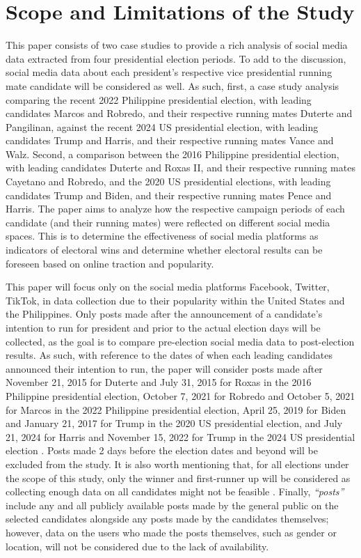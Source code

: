 \section{Scope and Limitations of the Study}
This paper consists of two case studies to provide a rich analysis of social media data extracted from four presidential election periods. To add to the discussion, social media data about each president’s respective vice presidential running mate candidate will be considered as well. As such, first, a case study analysis comparing the recent 2022 Philippine presidential election, with leading candidates Marcos and Robredo, and their respective running mates Duterte and Pangilinan, against the recent 2024 US presidential election, with leading candidates Trump and Harris, and their respective running mates Vance and Walz. Second, a comparison between the 2016 Philippine presidential election, with leading candidates Duterte and Roxas II, and their respective running mates Cayetano and Robredo, and the 2020 US presidential elections, with leading candidates Trump and Biden, and their respective running mates Pence and Harris. The paper aims to analyze how the respective campaign periods of each candidate (and their running mates) were reflected on different social media spaces. This is to determine the effectiveness of social media platforms as indicators of electoral wins and determine whether electoral results can be foreseen based on online traction and popularity.

This paper will focus only on the social media platforms Facebook, Twitter, TikTok, in data collection due to their popularity within the United States and the Philippines. Only posts made after the announcement of a candidate’s intention to run for president and prior to the actual election days will be collected, as the goal is to compare pre-election social media data to post-election results. As such, with reference to the dates of when each leading candidates announced their intention to run, the paper will consider posts made after November 21, 2015 for Duterte and July 31, 2015 for Roxas in the 2016 Philippine presidential election, October 7, 2021 for Robredo and October 5, 2021 for Marcos in the 2022 Philippine presidential election, April 25, 2019 for Biden and January 21, 2017 for Trump in the 2020 US presidential election, and July 21, 2024 for Harris and November 15, 2022 for Trump in the 2024 US presidential election \cite{SaL_Ranada-2015, SaL_Cupin-2015, SaL_Lalu-2021, SaL_Buan-2021,SaL_Beaumont-2019,SaL_Gold-2017,SaL_Viner-2024, SaL_Orr-2022}. Posts made 2 days before the election dates and beyond will be excluded from the study. It is also worth mentioning that, for all elections under the scope of this study, only the winner and first-runner up will be considered as collecting enough data on all candidates might not be feasible \cite{RRL_Macrohon-2022}. Finally, \emph{“posts”} include any and all publicly available posts made by the general public on the selected candidates alongside any posts made by the candidates themselves; however, data on the users who made the posts themselves, such as gender or location, will not be considered due to the lack of availability.

